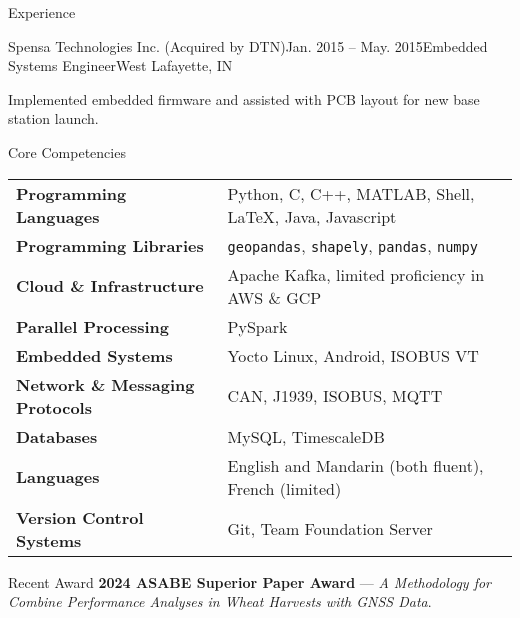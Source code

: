 \documentclass{resume}
\begin{document}
\begin{rSection}{Experience}
    \begin{rSubsection}{Spensa Technologies Inc. (Acquired by DTN)}{Jan. 2015 --
      May. 2015}{Embedded Systems Engineer}{West Lafayette, IN}
      \item Implemented embedded firmware and assisted with PCB layout for new
        base station launch.
    \end{rSubsection}

%
  \end{rSection}
  
  \begin{rSection}{Core Competencies}
    \begin{tabular}{ @{} >{\bfseries}l @{\hspace{6ex}} l }
      Programming Languages & Python, C, C++, MATLAB, Shell, \LaTeX, Java,
        Javascript \\
      Programming Libraries & \texttt{geopandas}, \texttt{shapely}, \texttt{pandas},
      \texttt{numpy} \\
      Cloud \& Infrastructure & Apache Kafka, limited proficiency in AWS \& GCP \\
      Parallel Processing & PySpark \\
      Embedded Systems & Yocto Linux, Android, ISOBUS VT \\
      Network \& Messaging Protocols & CAN, J1939, ISOBUS, MQTT \\
      Databases & MySQL, TimescaleDB \\
      Languages & English and Mandarin (both fluent), French (limited) \\
      Version Control Systems & Git, Team Foundation Server \\
    \end{tabular}
  \end{rSection}

  \begin{rSection}{Recent Award}
    \textbf{2024 ASABE Superior Paper Award} --- \textit{A Methodology for
    Combine Performance Analyses in Wheat Harvests with GNSS Data}.
  \end{rSection}
\end{document}
